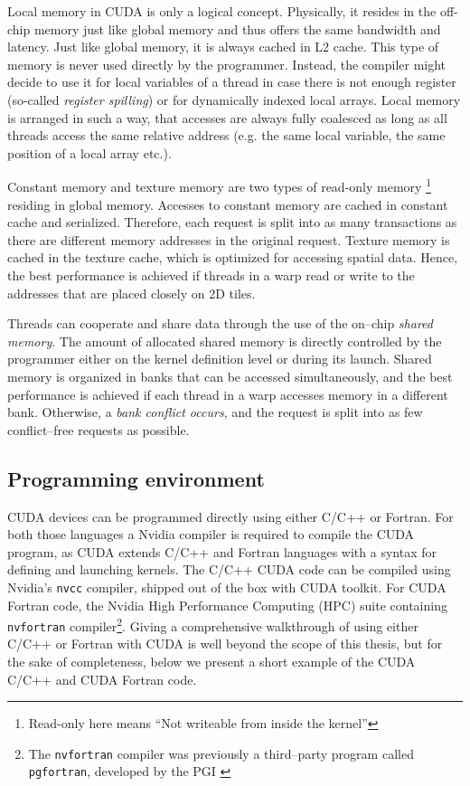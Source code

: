 Local memory in CUDA is only a logical concept. Physically, it resides in the off-chip memory just
like global memory and thus offers the same bandwidth and latency. Just like
global memory, it is always cached in L2 cache. This type of memory is never used directly by the
programmer. Instead, the compiler might decide to use it for local variables of a thread in case
there is not enough register (so-called \emph{register spilling}) or for dynamically indexed local
arrays. Local memory is arranged in such a way, that accesses are always fully coalesced as long as
all threads access the same relative address (e.g. the same local variable, the same position of a
local array etc.).

Constant memory and texture memory are two types of read-only memory \footnote{Read-only here means
``Not writeable from inside the kernel''} residing in global memory. Accesses to constant memory are
cached in constant cache and serialized. Therefore, each request is split into as many transactions
as there are different memory addresses in the original request. Texture memory is cached in the
texture cache, which is optimized for accessing spatial data. Hence, the best performance is
achieved if threads in a warp read or write to the addresses that are placed closely on 2D tiles.

Threads can cooperate and share data through the use of the on--chip \emph{shared memory}. The amount of allocated shared memory is directly controlled by the programmer either on the kernel definition level or during its launch. Shared memory is organized in banks that can be accessed simultaneously, and the best performance is achieved if each thread in a warp accesses memory in a different bank. Otherwise, a \emph{bank conflict occurs}, and the request is split into as few conflict--free requests as possible.


\subsection{Programming environment}
CUDA devices can be programmed directly using either C/C++ or Fortran. For both those languages a
Nvidia compiler is required to compile the CUDA program, as CUDA extends C/C++ and Fortran languages
with a syntax for defining and launching kernels. The C/C++ CUDA code can be compiled using Nvidia's
\texttt{nvcc} compiler, shipped out of the box with CUDA toolkit. For CUDA Fortran code, the Nvidia
High Performance Computing (HPC) suite containing \texttt{nvfortran} compiler\footnote{The
\texttt{nvfortran} compiler was previously a third--party program called \texttt{pgfortran},
developed by the PGI \cite{PGI}}. Giving a comprehensive walkthrough of using either
C/C++ or Fortran with CUDA is well beyond the scope of this thesis, but for the sake of
completeness, below we present a short example of the CUDA C/C++ and CUDA Fortran code.

